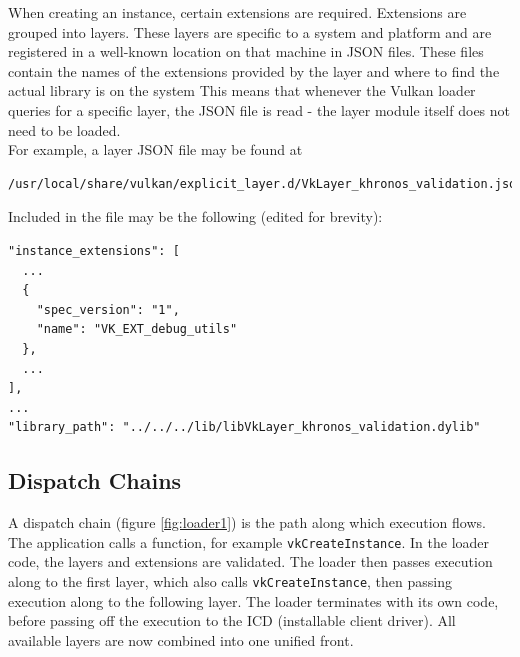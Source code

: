 \documentclass[12pt]{report}
\theoremstyle{definition}
\begin{document}
      When creating an instance, certain extensions are required. Extensions
      are grouped into layers. These layers are specific to a system and
      platform and are registered in a well-known location on that machine
      in JSON files. These files contain the names of the extensions provided
      by the layer and where to find the actual library is on the system This
      means that whenever the Vulkan loader queries for a specific layer, the
      JSON file is read - the layer module itself does not need to be loaded. \\

      For example, a layer JSON file may be found at \\

      \begin{centering}
        \begin{Verbatim}[fontsize=\small]
/usr/local/share/vulkan/explicit_layer.d/VkLayer_khronos_validation.json
        \end{Verbatim}
      \end{centering}

      Included in the file may be the following (edited for brevity):

      \begin{centering}
        \begin{Verbatim}[fontsize=\small]
"instance_extensions": [
  ...
  {   
    "spec_version": "1", 
    "name": "VK_EXT_debug_utils"
  },
  ...
],
...
"library_path": "../../../lib/libVkLayer_khronos_validation.dylib"
        \end{Verbatim}
      \end{centering}


      \subsection{Dispatch Chains}

      A dispatch chain (figure \ref{fig:loader1}) is the path along which execution flows. The application
      calls a function, for example \texttt{vkCreateInstance}. In the loader code, the
      layers and extensions are validated. The loader then passes execution
      along to the first layer, which also calls \texttt{vkCreateInstance}, then
      passing execution along to the following layer. The loader terminates
      with its own code, before passing off the execution to the ICD
      (installable client driver). All available layers are now combined
      into one unified front.
\end{document}

